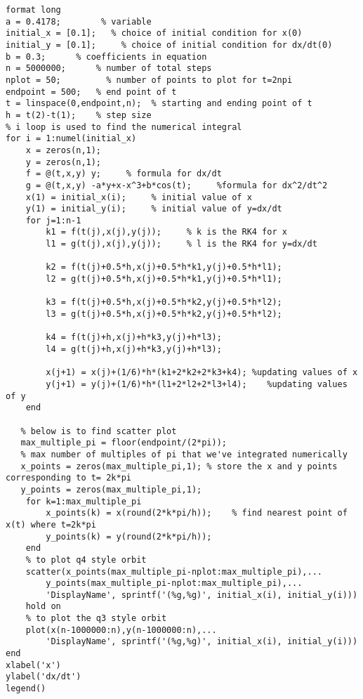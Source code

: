 \lstset{basicstyle=\footnotesize,style=myCustomMatlabStyle}
\begin{lstlisting}
format long
a = 0.4178;        % variable
initial_x = [0.1];   % choice of initial condition for x(0)
initial_y = [0.1];     % choice of initial condition for dx/dt(0)
b = 0.3;      % coefficients in equation
n = 5000000;      % number of total steps
nplot = 50;         % number of points to plot for t=2npi
endpoint = 500;   % end point of t 
t = linspace(0,endpoint,n);  % starting and ending point of t
h = t(2)-t(1);    % step size
% i loop is used to find the numerical integral
for i = 1:numel(initial_x)
    x = zeros(n,1);
    y = zeros(n,1);
    f = @(t,x,y) y;     % formula for dx/dt
    g = @(t,x,y) -a*y+x-x^3+b*cos(t);     %formula for dx^2/dt^2
    x(1) = initial_x(i);     % initial value of x
    y(1) = initial_y(i);     % initial value of y=dx/dt
    for j=1:n-1
        k1 = f(t(j),x(j),y(j));     % k is the RK4 for x
        l1 = g(t(j),x(j),y(j));     % l is the RK4 for y=dx/dt

        k2 = f(t(j)+0.5*h,x(j)+0.5*h*k1,y(j)+0.5*h*l1);
        l2 = g(t(j)+0.5*h,x(j)+0.5*h*k1,y(j)+0.5*h*l1);

        k3 = f(t(j)+0.5*h,x(j)+0.5*h*k2,y(j)+0.5*h*l2);
        l3 = g(t(j)+0.5*h,x(j)+0.5*h*k2,y(j)+0.5*h*l2);

        k4 = f(t(j)+h,x(j)+h*k3,y(j)+h*l3);
        l4 = g(t(j)+h,x(j)+h*k3,y(j)+h*l3);

        x(j+1) = x(j)+(1/6)*h*(k1+2*k2+2*k3+k4); %updating values of x
        y(j+1) = y(j)+(1/6)*h*(l1+2*l2+2*l3+l4);    %updating values of y
    end
    
   % below is to find scatter plot
   max_multiple_pi = floor(endpoint/(2*pi));    
   % max number of multiples of pi that we've integrated numerically
   x_points = zeros(max_multiple_pi,1); % store the x and y points corresponding to t= 2k*pi
   y_points = zeros(max_multiple_pi,1);
    for k=1:max_multiple_pi
        x_points(k) = x(round(2*k*pi/h));    % find nearest point of x(t) where t=2k*pi
        y_points(k) = y(round(2*k*pi/h));   
    end
    % to plot q4 style orbit
    scatter(x_points(max_multiple_pi-nplot:max_multiple_pi),...
        y_points(max_multiple_pi-nplot:max_multiple_pi),...
        'DisplayName', sprintf('(%g,%g)', initial_x(i), initial_y(i)))
    hold on
    % to plot the q3 style orbit
    plot(x(n-1000000:n),y(n-1000000:n),...
        'DisplayName', sprintf('(%g,%g)', initial_x(i), initial_y(i)))
end
xlabel('x')
ylabel('dx/dt')
legend()

\end{lstlisting}
